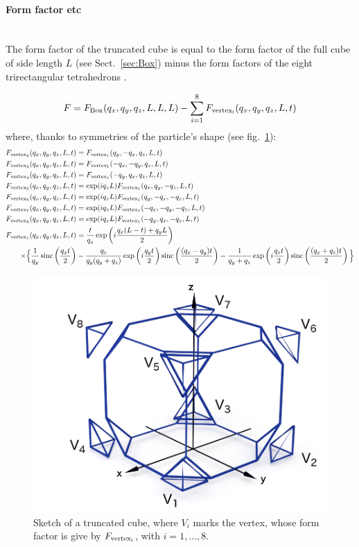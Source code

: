 \paragraph{Form factor etc}\strut\\
The form factor of the truncated cube is equal to the form factor of the full cube of side length $L$ (see Sect.~\ref{sec:Box}) minus the form factors of the eight trirectangular tetrahedrons \cite{HeSS74}.

\begin{equation*}
F =F_{\rm{Box}}(q_x,q_y,q_z, L, L, L) - \sum_{i=1}^8 F_{\rm{vertex}_i}(q_x, q_y, q_z, L, t)
\end{equation*}
where, thanks to symmetries of the particle's shape (see fig.~\ref{fig:FFTrcubesketchaxes}):
\begin{align*}
F_{\rm{vertex}_2}(q_x, q_y, q_z, L, t) &= F_{\rm{vertex}_1}(q_y, -q_x, q_z, L, t) \\
F_{\rm{vertex}_3}(q_x, q_y, q_z, L, t) &= F_{\rm{vertex}_1}(-q_x, -q_y, q_z, L, t) \\
F_{\rm{vertex}_4}(q_x, q_y, q_z, L, t) &= F_{\rm{vertex}_1}(-q_y, q_x, q_z, L, t) \\
F_{\rm{vertex}_5}(q_x, q_y, q_z, L, t) &= \exp(iq_zL)F_{\rm{vertex}_1}(q_x, q_y, -q_z, L, t) \\
F_{\rm{vertex}_6}(q_x, q_y, q_z, L, t) &= \exp(iq_zL)F_{\rm{vertex}_1}(q_y, -q_x,- q_z, L, t) \\
F_{\rm{vertex}_7}(q_x, q_y, q_z, L, t) &= \exp(iq_zL)F_{\rm{vertex}_1}(-q_x, -q_y, -q_z, L, t) \\
F_{\rm{vertex}_8}(q_x, q_y, q_z, L, t) &= \exp(iq_zL)F_{\rm{vertex}_1}(-q_y, q_x, -q_z, L, t) \\
F_{\rm{vertex}_1}(q_x, q_y, q_z, L, t) &=\frac{t}{q_z}\exp\left( i\frac{q_x(L-t)+ q_y L}{2} \right) \\
\times \Big\{ \frac{1}{q_y} \operatorname{sinc}\left( \frac{q_x t}{2}\right) &- \frac{q_z}{q_y(q_y + q_z)} \exp\left(i\frac{q_yt}{2}\right) \operatorname{sinc}\left( \frac{(q_x-q_y)t}{2}\right) - \frac{1}{q_y + q_z} \exp\left( i\frac{q_z t}{2} \right) \operatorname{sinc} \left( \frac{(q_x+q_z) t}{2} \right)  \Big\}    
\end{align*}

\begin{figure}[h]
\begin{center}
\includegraphics[width=.5\textwidth]{fig/drawing/SketchTruncatedcube.png}
\end{center}
\caption{Sketch of a truncated cube, where $V_i$ marks the vertex, whose form factor is give by $F_{\rm{vertex}_i}$, with $i=1,..., 8$.}
\label{fig:FFTrcubesketchaxes}
\end{figure}

